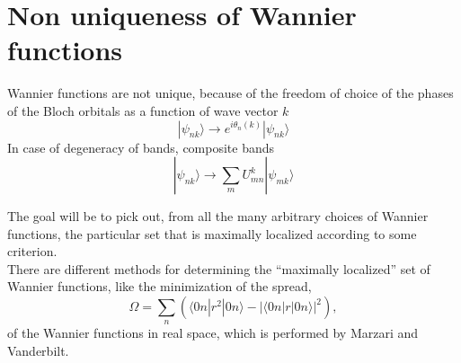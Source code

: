 \documentclass[12pt,a4paper,english]{beamer}
\newcommand{\ket}[1]{|#1\rangle}
\newcommand{\braopket}[3]{\langle #1|#2|#3\rangle}
\begin{document}
\section{Non uniqueness of Wannier functions}
\begin{frame}
  Wannier functions are not unique, because of the freedom of choice of the
  phases of the Bloch orbitals as a function of wave vector $k$
  \begin{equation}
	\ket{\psi_{nk}}\rightarrow e^{i\theta_n(k)}\ket{\psi_{nk}}
  \end{equation}
  In case of degeneracy of bands, composite bands
  \begin{equation}
	\ket{\psi_{nk}}\rightarrow \sum_m U^k_{mn}\ket{\psi_{mk}}
  \end{equation}
\end{frame}

\begin{frame}
  The goal will be to pick out, from all the many arbitrary choices of Wannier
  functions, the particular set that is maximally localized according to some
  criterion.\\
%
%
%
%
  There are different methods for determining the ``maximally localized'' set of Wannier
  functions, like the minimization of the spread,
  \begin{equation}
	\Omega=\sum_n\left(\braopket{0n}{r^2}{0n}-|\braopket{0n}{r}{0n}|^2 \right), 
  \end{equation}
  of the Wannier functions in real space, which is performed by Marzari and Vanderbilt.

\end{frame}


\end{document}
